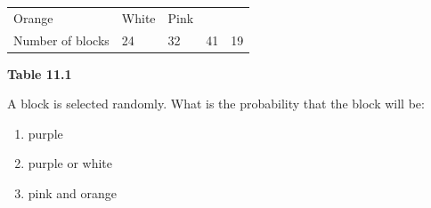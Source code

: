 \begin{enumerate}[noitemsep, label=\textbf{\arabic*}. ]
{\begin{center}
\begin{xtabular*}{\mytablewidth}[t]{|p{10\mystarwidth}|p{10\mystarwidth}|p{10\mystarwidth}|p{10\mystarwidth}|p{10\mystarwidth}|}
        Orange &
        White &
        Pink%
     \tabularnewline{}
        Number of
blocks &
        24 &
        32 &
        41 &
        19%
     \tabularnewline{}
    \end{xtabular*}
      \end{center}
    \begin{center}{\small\bfseries Table 11.1}\end{center}
        }%
    \par
A block is selected randomly. What is the probability that the block will be:
\label{m39377*id115050}\begin{enumerate}[noitemsep, label=\textbf{\alph*}. ] 
            \label{m39377*uid80}\item purple
\label{m39377*uid81}\item purple or white
\label{m39377*uid82}\item pink and orange

\end{enumerate}
\end{enumerate}
